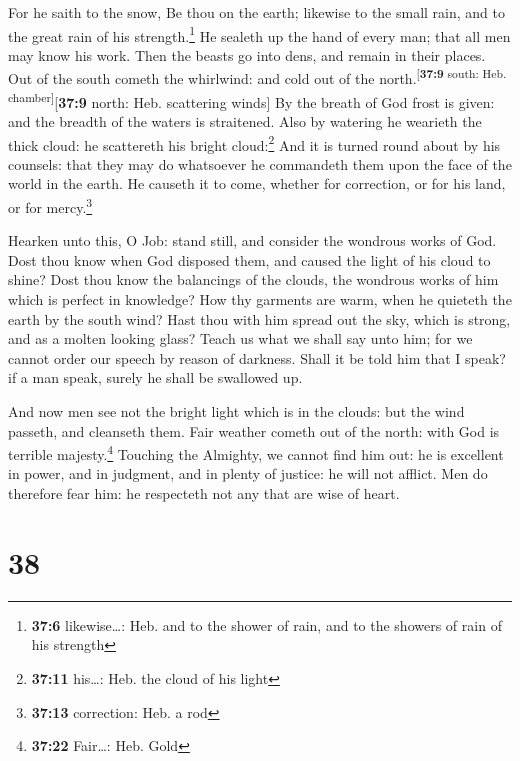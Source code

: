  For he saith to the snow, Be thou on the earth; likewise
to the small rain, and to the great rain of his strength.\footnote{\textbf{37:6}
  likewise\ldots: Heb. and to the shower of rain, and to the showers of
  rain of his strength}  He sealeth up the hand of every
man; that all men may know his work.  Then the beasts go
into dens, and remain in their places.  Out of the south
cometh the whirlwind: and cold out of the
north.\textsuperscript{{[}\textbf{37:9} south: Heb.
chamber{]}}{[}\textbf{37:9} north: Heb. scattering winds{]}
 By the breath of God frost is given: and the breadth of
the waters is straitened.  Also by watering he wearieth
the thick cloud: he scattereth his bright cloud:\footnote{\textbf{37:11}
  his\ldots: Heb. the cloud of his light}  And it is
turned round about by his counsels: that they may do whatsoever he
commandeth them upon the face of the world in the earth. 
He causeth it to come, whether for correction, or for his land, or for
mercy.\footnote{\textbf{37:13} correction: Heb. a rod}

 Hearken unto this, O Job: stand still, and consider the
wondrous works of God.  Dost thou know when God disposed
them, and caused the light of his cloud to shine?  Dost
thou know the balancings of the clouds, the wondrous works of him which
is perfect in knowledge?  How thy garments are warm, when
he quieteth the earth by the south wind?  Hast thou with
him spread out the sky, which is strong, and as a molten looking glass?
 Teach us what we shall say unto him; for we cannot order
our speech by reason of darkness.  Shall it be told him
that I speak? if a man speak, surely he shall be swallowed up.

 And now men see not the bright light which is in the
clouds: but the wind passeth, and cleanseth them.  Fair
weather cometh out of the north: with God is terrible
majesty.\footnote{\textbf{37:22} Fair\ldots: Heb. Gold} 
Touching the Almighty, we cannot find him out: he is excellent in power,
and in judgment, and in plenty of justice: he will not afflict.
 Men do therefore fear him: he respecteth not any that
are wise of heart.

\hypertarget{section-37}{%
\section{38}\label{section-37}}

